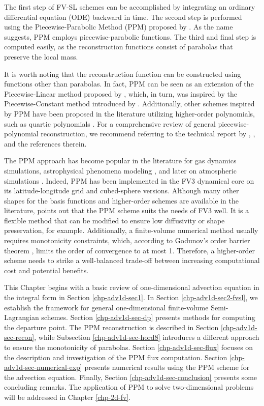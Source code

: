 The first step of FV-SL schemes can be accomplished by integrating an ordinary differential
equation (ODE) backward in time.
The second step is performed using the Piecewise-Parabolic Method (PPM) proposed by \citet{colella:1984}.
As the name suggests, PPM employs piecewise-parabolic functions.
The third and final step is computed easily, as the reconstruction functions consist of parabolas that preserve the local mass.

It is worth noting that the reconstruction function can be constructed using functions other than parabolas.
In fact, PPM can be seen as an
extension of the Piecewise-Linear method proposed by \citet{vanleer:1977}, which,
in turn, was inspired by the Piecewise-Constant method introduced by \citet{godunov:1959}. 
Additionally, other schemes inspired by PPM have been proposed in the literature utilizing
higher-order polynomials, such as quartic polynomials \citep{white:2008}. For a
comprehensive review of general piecewise-polynomial reconstruction, we recommend
referring to the technical report by \citet{engwirda:2016}, \citet{lauritzen:2011}, and the
references therein.

The PPM approach has become popular in the literature for gas dynamics simulations, astrophysical 
phenomena modeling \citep{woodward:1986}, and later on atmospheric simulations \citep{carpenter:1990}. 
Indeed, PPM has been implemented in the FV3 dynamical core on its latitude-longitude grid \citep{lin:2004}
and cubed-sphere \citep{putman:2007} versions.
Although many other shapes for the basis functions and higher-order schemes are available in the literature, 
\citet{harris:2021} points out that the PPM scheme suits the needs of FV3 well. It is a flexible method that
can be modified to ensure low diffusivity or shape preservation, for example.
Additionally, a finite-volume numerical method usually requires monotonicity constraints, which, according 
to Godunov's order barrier theorem \citep{wesseling:2001}, limits the order of convergence to at most 1. 
Therefore, a higher-order scheme needs to strike a well-balanced trade-off between increasing computational 
cost and potential benefits.

This Chapter begins with a basic review of one-dimensional advection equation in the integral form
in Section \ref{chp-adv1d-sec1}. In Section \ref{chp-adv1d-sec2-fvsl}, we establish the framework for general
one-dimensional finite-volume Semi-Lagrangian schemes. Section \ref{chp-adv1d-sec-dp} presents
methods for computing the departure point. The PPM reconstruction is described in Section \ref{chp-adv1d-sec-recon},
while Subsection \ref{chp-adv1d-sec-hord8} introduces a different approach to ensure the monotonicity of parabolas.
Section \ref{chp-adv1d-sec-flux} focuses on the description and investigation of the PPM flux computation.
Section \ref{chp-adv1d-sec-numerical-exp}
presents numerical results using the PPM scheme for the advection equation.
Finally, Section \ref{chp-adv1d-sec-conclusion} presents some concluding remarks.
The application of PPM to solve two-dimensional problems will be addressed in Chapter \ref{chp-2d-fv}.

